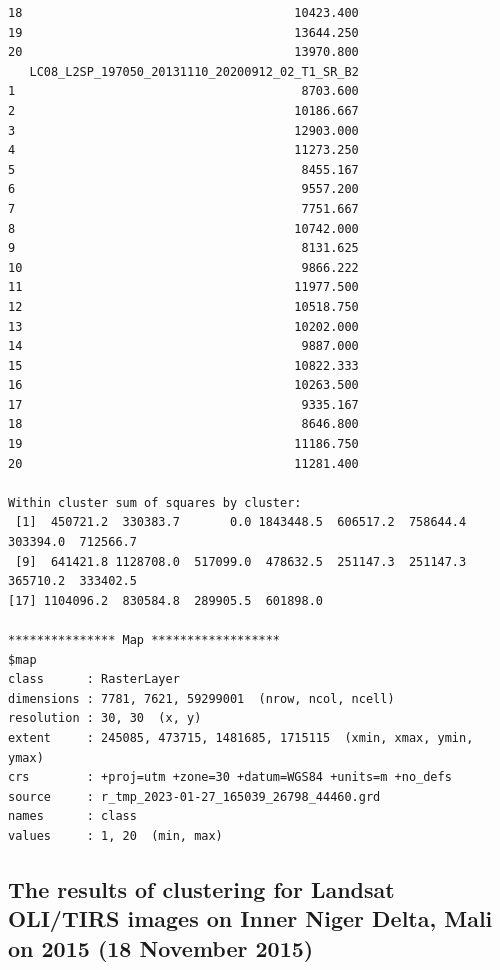 \documentclass[12pt,a4paper,oneside]{article}
\begin{document}
\begin{scriptsize}
\begin{verbatim}
18                                      10423.400
19                                      13644.250
20                                      13970.800
   LC08_L2SP_197050_20131110_20200912_02_T1_SR_B2
1                                        8703.600
2                                       10186.667
3                                       12903.000
4                                       11273.250
5                                        8455.167
6                                        9557.200
7                                        7751.667
8                                       10742.000
9                                        8131.625
10                                       9866.222
11                                      11977.500
12                                      10518.750
13                                      10202.000
14                                       9887.000
15                                      10822.333
16                                      10263.500
17                                       9335.167
18                                       8646.800
19                                      11186.750
20                                      11281.400

Within cluster sum of squares by cluster:
 [1]  450721.2  330383.7       0.0 1843448.5  606517.2  758644.4  303394.0  712566.7
 [9]  641421.8 1128708.0  517099.0  478632.5  251147.3  251147.3  365710.2  333402.5
[17] 1104096.2  830584.8  289905.5  601898.0

*************** Map ******************
$map
class      : RasterLayer 
dimensions : 7781, 7621, 59299001  (nrow, ncol, ncell)
resolution : 30, 30  (x, y)
extent     : 245085, 473715, 1481685, 1715115  (xmin, xmax, ymin, ymax)
crs        : +proj=utm +zone=30 +datum=WGS84 +units=m +no_defs 
source     : r_tmp_2023-01-27_165039_26798_44460.grd 
names      : class 
values     : 1, 20  (min, max)
\end{verbatim}
\end{scriptsize}

\subsection*{The results of clustering for Landsat OLI/TIRS images on Inner Niger Delta, Mali on 2015 (18 November 2015)}
\end{document}

